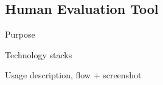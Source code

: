 \subsection{Human Evaluation Tool}

Purpose

Technology stacks

Usage description, flow + screenshot

